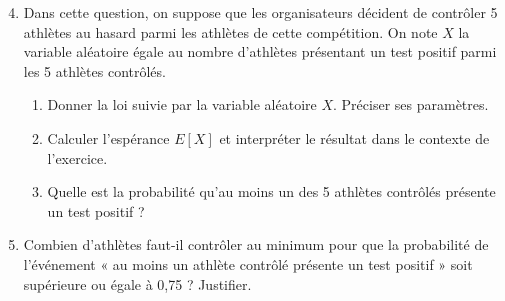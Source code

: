 \documentclass[11pt,fleqn, openany]{book} %
\begin{document}
\begin{exercise}[topic=prob13, subtitle={(Amérique du Nord 2021)}]
\begin{enumerate}
\setcounter{enumi}{3}
\item Dans cette question, on suppose que les organisateurs décident de contrôler 5 athlètes au hasard parmi les athlètes de cette compétition. On note $X$ la variable aléatoire égale au nombre d'athlètes présentant un test
positif parmi les 5 athlètes contrôlés. 
\begin{enumerate}
\item Donner la loi suivie par la variable aléatoire $X$. Préciser ses paramètres.
\item Calculer l'espérance $E[X]$ et interpréter le résultat dans le contexte de l'exercice.
\item Quelle est la probabilité qu'au moins un des 5 athlètes contrôlés présente un test positif ?
\end{enumerate} 
\item Combien d'athlètes faut-il contrôler au minimum pour que la probabilité de l'événement « au moins un athlète contrôlé présente un test positif » soit supérieure ou égale à 0,75 ? Justifier.\end{enumerate}


\end{exercise}
\end{document}
